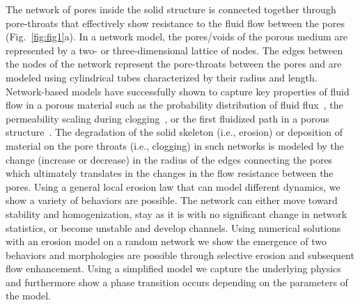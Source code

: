 \documentclass[%
 reprint,
 amsmath,amssymb,
 aps,
]{revtex4-1}
\begin{document}
The network of pores inside the solid structure is connected together through pore-throats that effectively show resistance to the fluid flow between the pores (Fig.~\ref{fig:fig1}a). In a network model, the pores/voids of the porous medium are represented by a two- or three-dimensional lattice of nodes. The edges between the nodes of the network represent the pore-throats between the pores and are modeled using cylindrical tubes characterized by their radius and length. 
Network-based models have successfully shown to capture key properties of fluid flow in a porous material such as the probability distribution of fluid flux~\cite{alim2017local}, the permeability scaling during clogging~\cite{shima2021}, or the first fluidized path in a porous structure~\cite{fraggedakis_chaparian_tammisola_2021}. 
The degradation of the solid skeleton (i.e., erosion) or deposition of material on the pore throats (i.e., clogging) in such networks is modeled by the change (increase or decrease) in the radius of the edges connecting the pores which ultimately translates in the changes in the flow resistance between the pores. Using a general local erosion law that can model different dynamics, we show a variety of behaviors are possible. The network can either move toward stability and homogenization, stay as it is with no significant change in network statistics, or become unstable and develop channels. Using numerical solutions with an erosion model on a random network we show the emergence of two behaviors and morphologies are possible through selective erosion and subsequent flow enhancement. Using a simplified model we capture the underlying physics and furthermore show a phase transition occurs depending on the parameters of the model. 
\end{document}
